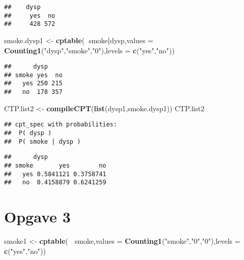 \documentclass[
]{article}
\newenvironment{Shaded}{\begin{snugshade}}{\end{snugshade}}
\newcommand{\DataTypeTok}[1]{\textcolor[rgb]{0.13,0.29,0.53}{#1}}
\newcommand{\KeywordTok}[1]{\textcolor[rgb]{0.13,0.29,0.53}{\textbf{#1}}}
\newcommand{\NormalTok}[1]{#1}
\newcommand{\OperatorTok}[1]{\textcolor[rgb]{0.81,0.36,0.00}{\textbf{#1}}}
\newcommand{\StringTok}[1]{\textcolor[rgb]{0.31,0.60,0.02}{#1}}
\begin{document}
\begin{verbatim}
##    dysp
##     yes  no
##     428 572
\end{verbatim}

\begin{Shaded}
\begin{Highlighting}[]
\NormalTok{smoke.dysp1 <-}\StringTok{ }\KeywordTok{cptable}\NormalTok{(}\OperatorTok{~}\NormalTok{smoke}\OperatorTok{|}\NormalTok{dysp,}\DataTypeTok{values =} \KeywordTok{Counting1}\NormalTok{(}\StringTok{"dysp"}\NormalTok{,}\StringTok{"smoke"}\NormalTok{,}\StringTok{"0"}\NormalTok{),}\DataTypeTok{levels =} \KeywordTok{c}\NormalTok{(}\StringTok{"yes"}\NormalTok{,}\StringTok{"no"}\NormalTok{))}
\end{Highlighting}
\end{Shaded}

\begin{verbatim}
##      dysp
## smoke yes  no
##   yes 250 215
##   no  178 357
\end{verbatim}

\begin{Shaded}
\begin{Highlighting}[]
\NormalTok{CTP.list2 <-}\StringTok{ }\KeywordTok{compileCPT}\NormalTok{(}\KeywordTok{list}\NormalTok{(dysp1,smoke.dysp1))}
\NormalTok{CTP.list2}
\end{Highlighting}
\end{Shaded}

\begin{verbatim}
## cpt_spec with probabilities:
##  P( dysp )
##  P( smoke | dysp )
\end{verbatim}

\begin{Shaded}
\end{Shaded}

\begin{verbatim}
##      dysp
## smoke       yes        no
##   yes 0.5841121 0.3758741
##   no  0.4158879 0.6241259
\end{verbatim}

\hypertarget{opgave-3}{%
\section{Opgave 3}\label{opgave-3}}

\begin{Shaded}
\begin{Highlighting}[]
\NormalTok{smoke1 <-}\StringTok{ }\KeywordTok{cptable}\NormalTok{(}\OperatorTok{~}\StringTok{ }\NormalTok{smoke,}\DataTypeTok{values =} \KeywordTok{Counting1}\NormalTok{(}\StringTok{"smoke"}\NormalTok{,}\StringTok{"0"}\NormalTok{,}\StringTok{"0"}\NormalTok{),}\DataTypeTok{levels =} \KeywordTok{c}\NormalTok{(}\StringTok{"yes"}\NormalTok{,}\StringTok{"no"}\NormalTok{))}
\end{Highlighting}
\end{Shaded}
\end{document}
